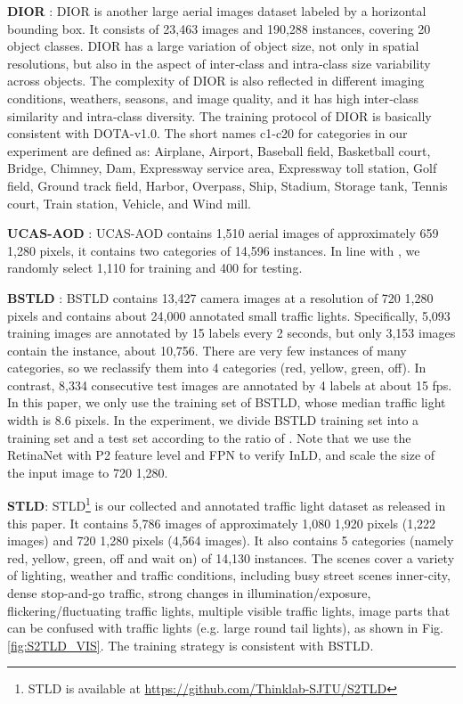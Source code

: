 \documentclass[10pt,journal,compsoc]{IEEEtran}
\begin{document}
\textbf{DIOR} \cite{li2020object}: DIOR is another large aerial images dataset labeled by a horizontal bounding box. It consists of 23,463 images and 190,288 instances, covering 20 object classes. DIOR has a large variation of object size, not only in spatial resolutions, but also in the aspect of inter‐class and intra‐class size variability across objects. The complexity of DIOR is also reflected in different imaging conditions, weathers, seasons, and image quality, and it has high inter‐class similarity and intra‐class diversity. The training protocol of DIOR is basically consistent with DOTA-v1.0. The short names c1-c20 for categories in our experiment are defined as: Airplane, Airport, Baseball field, Basketball court, Bridge, Chimney, Dam, Expressway service area, Expressway toll station, Golf field, Ground track field, Harbor, Overpass, Ship, Stadium, Storage tank, Tennis court, Train station, Vehicle, and Wind mill.

\textbf{UCAS-AOD} \cite{zhu2015orientation}: UCAS-AOD contains 1,510 aerial images of approximately 659  1,280 pixels, it contains two categories of 14,596 instances. In line with \cite{xia2018dota, azimi2018towards}, we randomly select 1,110 for training and 400 for testing.

\textbf{BSTLD} \cite{behrendt2017deep}: BSTLD contains 13,427 camera images at a resolution of 720  1,280 pixels and contains about 24,000 annotated small traffic lights. Specifically, 5,093 training images are annotated by 15 labels every 2 seconds, but only 3,153 images contain the instance, about 10,756. There are very few instances of many categories, so we reclassify them into 4 categories (red, yellow, green, off). In contrast, 8,334 consecutive test images are annotated by 4 labels at about 15 fps. In this paper, we only use the training set of BSTLD, whose median traffic light width is 8.6 pixels. In the experiment, we divide BSTLD training set into a training set and a test set according to the ratio of . Note that we use the RetinaNet with P2 feature level and FPN to verify InLD, and scale the size of the input image to 720  1,280.

\textbf{STLD}: STLD\footnote{STLD is available at \url{https://github.com/Thinklab-SJTU/S2TLD}} is our collected and annotated traffic light dataset as released in this paper. It contains 5,786 images of approximately 1,080  1,920 pixels (1,222 images) and 720  1,280 pixels (4,564 images). It also contains 5 categories (namely red, yellow, green, off and wait on) of 14,130 instances. The scenes cover a variety of lighting, weather and traffic conditions, including busy street scenes inner-city, dense stop-and-go traffic, strong changes in illumination/exposure, flickering/fluctuating traffic lights, multiple visible traffic lights, image parts that can be confused with traffic lights (e.g. large round tail lights), as shown in Fig. \ref{fig:S2TLD_VIS}. The training strategy is consistent with BSTLD.
\end{document}
